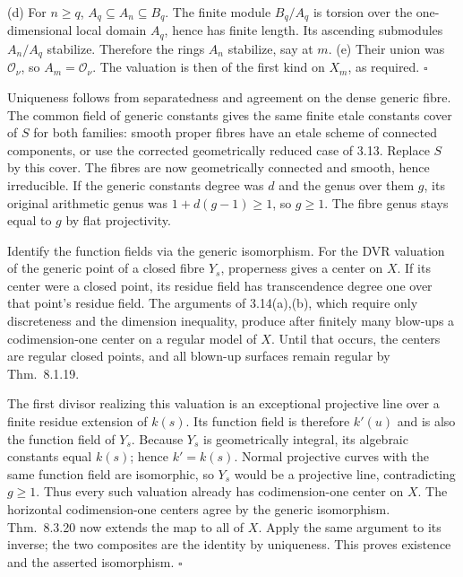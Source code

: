 \documentclass[11pt]{article}
\let\chapterexercise\exercise
\renewcommand{\exercise}[2]{\Needspace{8\baselineskip}\chapterexercise{#1}{#2}}
\begin{document}
(d) For $n\ge q$, $A_q\subseteq A_n\subseteq B_q$. The finite module $B_q/A_q$ is torsion over the one-dimensional local domain $A_q$, hence has finite length. Its ascending submodules $A_n/A_q$ stabilize. Therefore the rings $A_n$ stabilize, say at $m$. (e) Their union was $\mathcal O_\nu$, so $A_m=\mathcal O_\nu$. The valuation is then of the first kind on $X_m$, as required. \hfill$\square$

\pf
Uniqueness follows from separatedness and agreement on the dense generic fibre. The common field of generic constants gives the same finite etale constants cover of $S$ for both families: smooth proper fibres have an etale scheme of connected components, or use the corrected geometrically reduced case of 3.13. Replace $S$ by this cover. The fibres are now geometrically connected and smooth, hence irreducible. If the generic constants degree was $d$ and the genus over them $g$, its original arithmetic genus was $1+d(g-1)\ge1$, so $g\ge1$. The fibre genus stays equal to $g$ by flat projectivity.

Identify the function fields via the generic isomorphism. For the DVR valuation of the generic point of a closed fibre $Y_s$, properness gives a center on $X$. If its center were a closed point, its residue field has transcendence degree one over that point's residue field. The arguments of 3.14(a),(b), which require only discreteness and the dimension inequality, produce after finitely many blow-ups a codimension-one center on a regular model of $X$. Until that occurs, the centers are regular closed points, and all blown-up surfaces remain regular by Thm.~8.1.19.

The first divisor realizing this valuation is an exceptional projective line over a finite residue extension of $k(s)$. Its function field is therefore $k'(u)$ and is also the function field of $Y_s$. Because $Y_s$ is geometrically integral, its algebraic constants equal $k(s)$; hence $k'=k(s)$. Normal projective curves with the same function field are isomorphic, so $Y_s$ would be a projective line, contradicting $g\ge1$. Thus every such valuation already has codimension-one center on $X$. The horizontal codimension-one centers agree by the generic isomorphism. Thm.~8.3.20 now extends the map to all of $X$. Apply the same argument to its inverse; the two composites are the identity by uniqueness. This proves existence and the asserted isomorphism. \hfill$\square$
\end{document}
